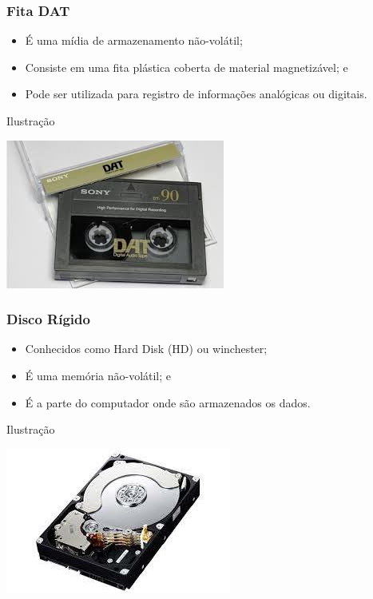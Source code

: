 \documentclass[aspectratio=169]{beamer} %
\begin{document}
\begin{frame}
	\frametitle{Fita DAT}
		
	\begin{itemize}
		\item É uma mídia de armazenamento não-volátil;
		\item Consiste em uma fita plástica coberta de material magnetizável; e 
		\item Pode ser utilizada para registro de informações analógicas ou digitais.
	\end{itemize}\vfill
	
	\begin{exampleblock}{Ilustra\c cão}
		\begin{center}
			\includegraphics[scale=0.4]{img/fita_dat}
		\end{center}		
	\end{exampleblock}
\end{frame}

\begin{frame}
	\frametitle{Disco Rígido}
		
	\begin{itemize}
		\item Conhecidos como Hard Disk (HD) ou winchester;
		\item É uma memória não-volátil; e
		\item É a parte do computador onde são armazenados os dados.
	\end{itemize}\vfill
	
	\begin{exampleblock}{Ilustra\c cão}
		\begin{center}
			\includegraphics[scale=0.4]{img/hd}
		\end{center}		
	\end{exampleblock}
\end{frame}
\end{document}
